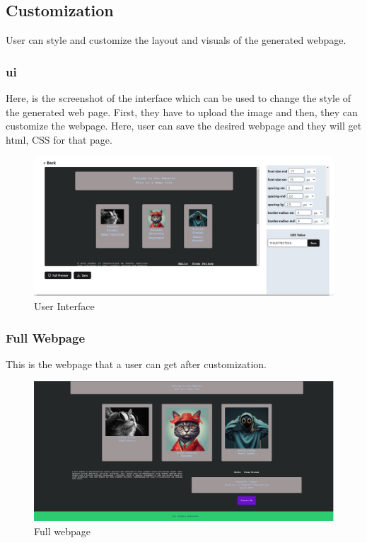 \documentclass{ioereport}
\begin{document}
\subsection{Customization}
User can style and customize the layout and visuals of the generated webpage.
\subsubsection{\gls{ui}}
Here, is the screenshot of the interface which can be used to change the style of the 
generated web page. First, they have to upload the image and then, they can customize the webpage. Here, user can save the desired webpage and they will get html, CSS for that page.



\begin{figure}[H]
    \centering
           \includegraphics[scale=0.25, trim=230 10 190 10]{images/user interface.png}
           \caption{User Interface}
           \label{fig:ui}
       \end{figure}
   

\subsubsection{Full Webpage}
This is the webpage that a user can get after customization.

\begin{figure}[H]
    \centering
           \includegraphics[scale=0.25,trim=230 10 190 10, clip]{images/full webpage.png}
           \caption{Full webpage}
           \label{fig:fullweb}
       \end{figure}
\end{document}
